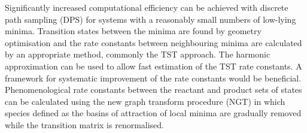 Significantly increased computational efficiency can be achieved with discrete path sampling\cite{Wales2002, Wales2006, Carr2009} (DPS) for systems with a reasonably small numbers of low-lying minima.
Transition states between the minima are found by geometry \mbox{optimisation\cite{Pancir1975, Cerjan1981, Henkelman2000}} and the rate constants between neighbouring minima are calculated by an appropriate method, commonly the TST approach.
The harmonic approximation can be used to allow fast estimation of the TST rate constants.
A framework for systematic improvement of the rate constants would be beneficial.
Phenomenological rate constants between the reactant and product sets of states can be calculated using the new graph transform procedure\cite{Wales2009} (NGT) in which species defined as the basins of attraction of local minima are gradually removed while the transition matrix is renormalised.

